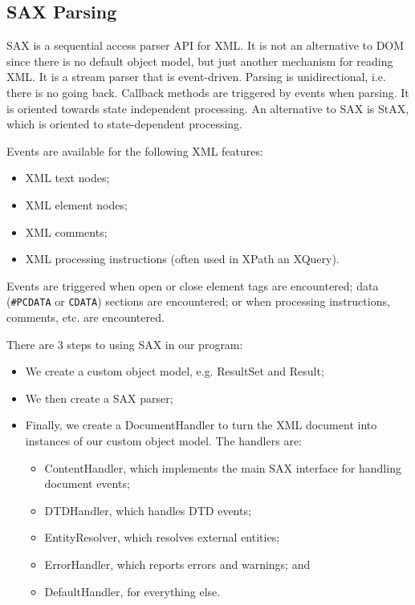 \documentclass[a4paper, openany]{memoir}
\begin{document}
\subsection{SAX Parsing}
SAX is a sequential access parser API for XML. It is not an alternative to DOM since there is no default object model, but just another mechanism for reading XML. It is a stream parser that is event-driven. Parsing is unidirectional, i.e. there is no going back. Callback methods are triggered by events when parsing. It is oriented towards state independent processing. An alternative to SAX is StAX, which is oriented to state-dependent processing.

\noindent Events are available for the following XML features:
\begin{itemize}
    \item XML text nodes;
    \item XML element nodes;
    \item XML comments;
    \item XML processing instructions (often used in XPath an XQuery).
\end{itemize}
Events are triggered when open or close element tags are encountered; data (\texttt{\#PCDATA} or \texttt{CDATA}) sections are encountered; or when processing instructions, comments, etc. are encountered.

\noindent There are 3 steps to using SAX in our program:
\begin{itemize}
    \item We create a custom object model, e.g. ResultSet and Result;
    \item We then create a SAX parser;
    \item Finally, we create a DocumentHandler to turn the XML document into instances of our custom object model. The handlers are:
    \begin{itemize}
        \item ContentHandler, which implements the main SAX interface for handling document events;
        \item DTDHandler, which handles DTD events;
        \item EntityResolver, which resolves external entities;
        \item ErrorHandler, which reports errors and warnings; and
        \item DefaultHandler, for everything else.
    \end{itemize}
\end{itemize}
\end{document}

